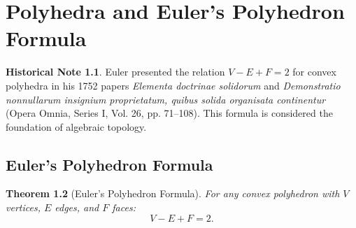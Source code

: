 \documentclass[11pt,a4paper,twoside]{book}
\theoremstyle{eulerstyle}
\newtheorem{theorem}{Theorem}[chapter]
\theoremstyle{definition}
\newtheorem{historical}[theorem]{Historical Note}
\begin{document}
\chapter{Polyhedra and Euler's Polyhedron Formula}
\label{ch:polyhedra}

\begin{historical}
Euler presented the relation $V - E + F = 2$ for convex polyhedra in his 1752 papers \emph{Elementa doctrinae solidorum} and \emph{Demonstratio nonnullarum insignium proprietatum, quibus solida organisata continentur} (Opera Omnia, Series I, Vol. 26, pp. 71--108). This formula is considered the foundation of algebraic topology. \cite{euler1752}\end{historical}

\section{Euler's Polyhedron Formula}

\begin{theorem}[Euler's Polyhedron Formula]
For any convex polyhedron with $V$ vertices, $E$ edges, and $F$ faces:
\[
V - E + F = 2.
\]
\end{theorem}
\end{document}
